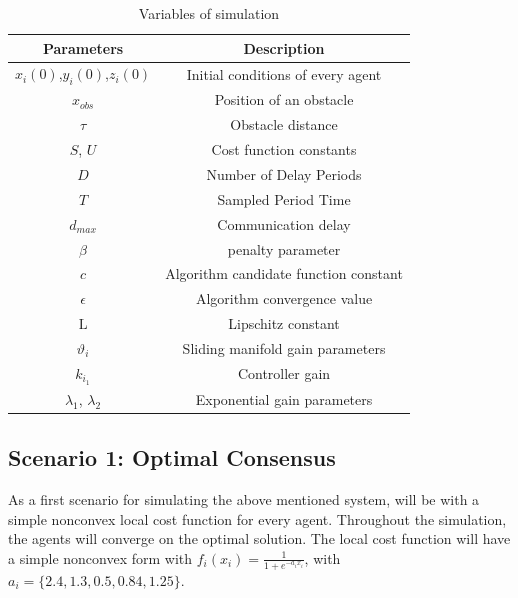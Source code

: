     \begin{table}[h]
        \centering
        \begin{tabular}{|c||c|}
        \hline
             Parameters &  Description\\
             \hline\hline
             $x_i(0)$,$y_i(0)$,$z_i(0)$ & Initial conditions of every agent\\
             \hline
             $x_{obs}$ & Position of an obstacle\\
             \hline
             $\tau$ & Obstacle distance\\
             \hline
             $S$, $U$ & Cost function constants\\
             \hline
             $D$ & Number of Delay Periods\\
             \hline
             $T$ & Sampled Period Time\\
             \hline
             $d_{max}$ & Communication delay\\
             \hline
             $\beta$ & penalty parameter\\
             \hline
             $c$ & Algorithm candidate function constant\\
             \hline
             $\epsilon$ & Algorithm convergence value\\
             \hline
             $\mathrm{L}$ & Lipschitz constant\\
             \hline
             $\vartheta_i$ & Sliding manifold gain parameters\\
             \hline
             $k_{i_1}$ & Controller gain\\
             \hline
             $\lambda_1$, $\lambda_2$ & Exponential gain parameters\\
        \hline
        \end{tabular}
        \caption{Variables of simulation}
        \label{tab:5.2}
    \end{table}



\subsection{Scenario 1: Optimal Consensus}
    As a first scenario for simulating the above mentioned system, will be with a simple nonconvex local cost function for every agent. Throughout the simulation, the agents will converge on the optimal solution. The local cost function will have a simple nonconvex form with $f_i(x_i) = \frac{1}{1 + e^{-a_ix_i}}$, with $a_i = \{2.4, 1.3, 0.5, 0.84, 1.25\}$. 

















